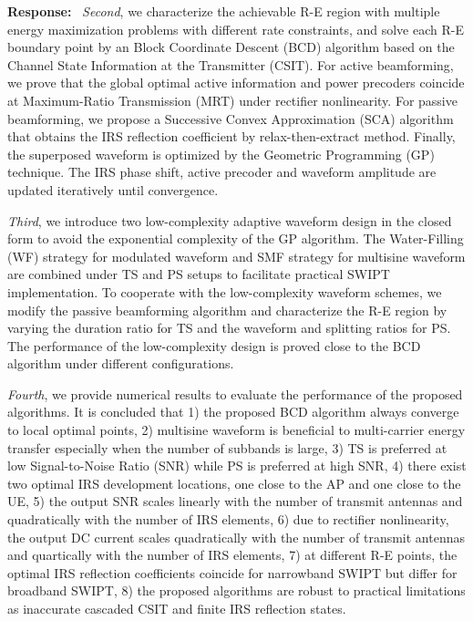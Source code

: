 \documentclass{article}
\newcounter{reviewer}
\newcounter{point}[reviewer]
\newcounter{response}[reviewer]
\newenvironment{response}
	{\refstepcounter{response} \medskip \noindent \textbf{Response:}\ }
	{\medskip}
\begin{document}
\begin{reviewersection}
\begin{response}
			\emph{Second}, we characterize the achievable R-E region with multiple energy maximization problems with different rate constraints, and solve each R-E boundary point by an Block Coordinate Descent (BCD) algorithm based on the Channel State Information at the Transmitter (CSIT). For active beamforming, we prove that the global optimal active information and power precoders coincide at Maximum-Ratio Transmission (MRT) under rectifier nonlinearity. For passive beamforming, we propose a Successive Convex Approximation (SCA) algorithm that obtains the IRS reflection coefficient by relax-then-extract method. Finally, the superposed waveform is optimized by the Geometric Programming (GP) technique. The IRS phase shift, active precoder and waveform amplitude are updated iteratively until convergence.

			\emph{Third}, we introduce two low-complexity adaptive waveform design in the closed form to avoid the exponential complexity of the GP algorithm. The Water-Filling (WF) strategy for modulated waveform and SMF strategy for multisine waveform are combined under TS and PS setups to facilitate practical SWIPT implementation. To cooperate with the low-complexity waveform schemes, we modify the passive beamforming algorithm and characterize the R-E region by varying the duration ratio for TS and the waveform and splitting ratios for PS. The performance of the low-complexity design is proved close to the BCD algorithm under different configurations.

			\emph{Fourth}, we provide numerical results to evaluate the performance of the proposed algorithms. It is concluded that 1) the proposed BCD algorithm always converge to local optimal points, 2) multisine waveform is beneficial to multi-carrier energy transfer especially when the number of subbands is large, 3) TS is preferred at low Signal-to-Noise Ratio (SNR) while PS is preferred at high SNR, 4) there exist two optimal IRS development locations, one close to the AP and one close to the UE, 5) the output SNR scales linearly with the number of transmit antennas and quadratically with the number of IRS elements, 6) due to rectifier nonlinearity, the output DC current scales quadratically with the number of transmit antennas and quartically with the number of IRS elements, 7) at different R-E points, the optimal IRS reflection coefficients coincide for narrowband SWIPT but differ for broadband SWIPT, 8) the proposed algorithms are robust to practical limitations as inaccurate cascaded CSIT and finite IRS reflection states.
			\label{re:3.2}
		\end{response}


\end{reviewersection}
\end{document}
